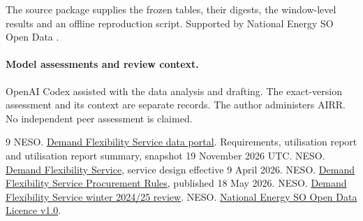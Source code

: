 \documentclass[11pt]{article}
\begin{document}
The source package supplies the frozen tables, their digests, the window-level results and an offline reproduction script. Supported by National Energy SO Open Data \cite{licence}.

\paragraph{Model assessments and review context.}
OpenAI Codex assisted with the data analysis and drafting. The exact-version assessment and its context are separate records. The author administers AIRR. No independent peer assessment is claimed.

\begin{thebibliography}{9}
 NESO. \href{https://www.neso.energy/data-portal/demand-flexibility}{Demand Flexibility Service data portal}. Requirements, utilisation report and utilisation report summary, snapshot 19 November 2026 UTC.
 NESO. \href{https://www.neso.energy/industry-information/balancing-services/demand-flexibility-service-dfs}{Demand Flexibility Service}, service design effective 9 April 2026.
 NESO. \href{https://www.neso.energy/document/379391/download}{Demand Flexibility Service Procurement Rules}, published 18 May 2026.
 NESO. \href{https://www.neso.energy/document/363911/download}{Demand Flexibility Service winter 2024/25 review}.
 NESO. \href{https://www.neso.energy/data-portal/neso-open-licence}{National Energy SO Open Data Licence v1.0}.
\end{thebibliography}
\end{document}
